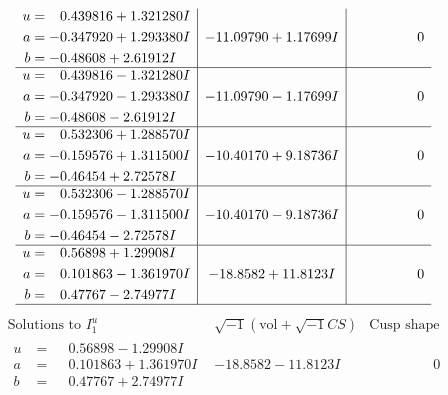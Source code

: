 \documentclass[1p]{elsarticle_modified}
\theoremstyle{definition}
\newcommand{\I}{\sqrt{-1}}
\begin{document}
$$\begin{array}{c|c|c}
\begin{aligned}
u &= \phantom{-}0.439816 + 1.321280 I \\
a &= -0.347920 + 1.293380 I \\
b &= -0.48608 + 2.61912 I\end{aligned}
 & -11.09790 + 1.17699 I & \phantom{-0.000000 } 0 \\ \hline\begin{aligned}
u &= \phantom{-}0.439816 - 1.321280 I \\
a &= -0.347920 - 1.293380 I \\
b &= -0.48608 - 2.61912 I\end{aligned}
 & -11.09790 - 1.17699 I & \phantom{-0.000000 } 0 \\ \hline\begin{aligned}
u &= \phantom{-}0.532306 + 1.288570 I \\
a &= -0.159576 + 1.311500 I \\
b &= -0.46454 + 2.72578 I\end{aligned}
 & -10.40170 + 9.18736 I & \phantom{-0.000000 } 0 \\ \hline\begin{aligned}
u &= \phantom{-}0.532306 - 1.288570 I \\
a &= -0.159576 - 1.311500 I \\
b &= -0.46454 - 2.72578 I\end{aligned}
 & -10.40170 - 9.18736 I & \phantom{-0.000000 } 0 \\ \hline\begin{aligned}
u &= \phantom{-}0.56898 + 1.29908 I \\
a &= \phantom{-}0.101863 - 1.361970 I \\
b &= \phantom{-}0.47767 - 2.74977 I\end{aligned}
 & -18.8582 + 11.8123 I & \phantom{-0.000000 } 0\\
 \hline 
 \end{array}$$\newpage$$\begin{array}{c|c|c}  
\text{Solutions to }I^u_{1}& \I (\text{vol} + \sqrt{-1}CS) & \text{Cusp shape}\\
 \hline 
\begin{aligned}
u &= \phantom{-}0.56898 - 1.29908 I \\
a &= \phantom{-}0.101863 + 1.361970 I \\
b &= \phantom{-}0.47767 + 2.74977 I\end{aligned}
 & -18.8582 - 11.8123 I & \phantom{-0.000000 } 0 \\ \hline\begin{aligned}

\end{aligned}
\end{array}$$
\end{document}
